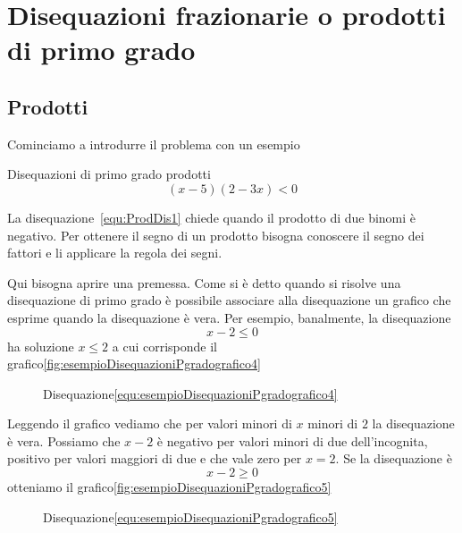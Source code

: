 \section{Disequazioni frazionarie o prodotti di primo grado}
\label{DisequazioniFrazionarieProdottiPrimoGrado}
\subsection{Prodotti}
Cominciamo a introdurre il problema con un esempio
\begin{esempiot}{Disequazioni di primo grado prodotti}{}
	\begin{equation}
(x-5)(2-3x)<0\label{equ:ProdDis1}
\end{equation}
\end{esempiot}
La disequazione~\vref{equ:ProdDis1} chiede quando il prodotto di due binomi è negativo.  Per ottenere il segno di un prodotto bisogna conoscere il segno dei fattori e li applicare la regola dei segni.\par Qui bisogna aprire una premessa. Come si è detto quando si risolve una disequazione di primo grado è possibile associare alla disequazione un grafico che esprime quando la disequazione è vera. Per esempio, banalmente, la disequazione
\begin{equation}
x-2\leq 0\label{equ:esempioDisequazioniPgradografico4}
\end{equation} ha soluzione $x\leq 2$ a cui corrisponde il grafico\nobs\vref{fig:esempioDisequazioniPgradografico4}
\begin{figure}
	\centering
		\captionsetup{format=grafico,list=no}
	\caption{Disequazione\nobs\vref{equ:esempioDisequazioniPgradografico4}}
	\label{fig:esempioDisequazioniPgradografico4}
\end{figure}\par Leggendo il grafico vediamo che  per valori minori di $x$  minori di $2$ la disequazione è vera. Possiamo che $x-2$ è negativo per valori minori di due dell'incognita, positivo per valori maggiori di due e che vale zero per $x=2$. Se la disequazione è 
\begin{equation}
x-2\geq 0\label{equ:esempioDisequazioniPgradografico5}
\end{equation}
otteniamo il grafico\nobs\vref{fig:esempioDisequazioniPgradografico5}
\begin{figure}
	\centering
	\captionsetup{format=grafico,list=no}
	\caption{Disequazione\nobs\vref{equ:esempioDisequazioniPgradografico5}}
	\label{fig:esempioDisequazioniPgradografico5}
\end{figure}


